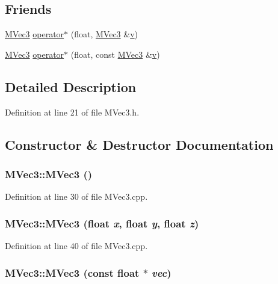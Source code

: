 \subsection*{Friends}
\begin{CompactItemize}
\item 
\hyperlink{class_m_vec3}{MVec3} \hyperlink{class_m_vec3_768f36f4b6204f86f0581112b603ffdb}{operator$\ast$} (float, \hyperlink{class_m_vec3}{MVec3} \&\hyperlink{glext__bak_8h_5cf89b94f7478c0ebc4429b60e7ef93b}{v})
\item 
\hyperlink{class_m_vec3}{MVec3} \hyperlink{class_m_vec3_c6a8f85e2fbf1a5ad503486a8598292b}{operator$\ast$} (float, const \hyperlink{class_m_vec3}{MVec3} \&\hyperlink{glext__bak_8h_5cf89b94f7478c0ebc4429b60e7ef93b}{v})
\end{CompactItemize}


\subsection{Detailed Description}


Definition at line 21 of file MVec3.h.

\subsection{Constructor \& Destructor Documentation}
\hypertarget{class_m_vec3_6ba0f0bb219d11a10b7b028fb45d6146}{
\subsubsection[{MVec3}]{\setlength{\rightskip}{0pt plus 5cm}MVec3::MVec3 ()}}
\label{class_m_vec3_6ba0f0bb219d11a10b7b028fb45d6146}




Definition at line 30 of file MVec3.cpp.\hypertarget{class_m_vec3_fca7472b1db64da1af3dfc6c0397e3a7}{
\subsubsection[{MVec3}]{\setlength{\rightskip}{0pt plus 5cm}MVec3::MVec3 (float {\em x}, \/  float {\em y}, \/  float {\em z})}}
\label{class_m_vec3_fca7472b1db64da1af3dfc6c0397e3a7}




Definition at line 40 of file MVec3.cpp.\hypertarget{class_m_vec3_b68860076beec4cccc14fd176bfac615}{
\subsubsection[{MVec3}]{\setlength{\rightskip}{0pt plus 5cm}MVec3::MVec3 (const float $\ast$ {\em vec})}}
\label{class_m_vec3_b68860076beec4cccc14fd176bfac615}




